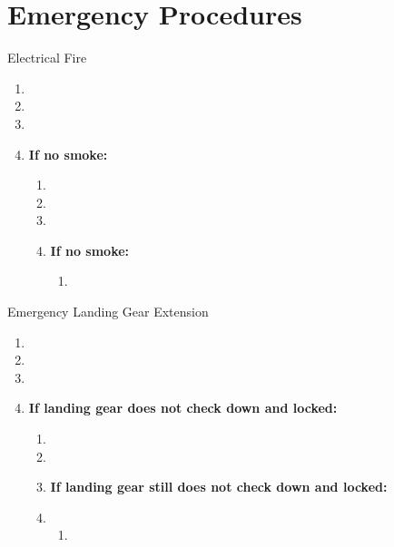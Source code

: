\section{Emergency Procedures}
\clearpage

\begin{checklist_emerg}{Electrical Fire}
    \begin{enumerate}
        \item {}
        \item {}
        \item {}
        \item{
            \textbf{If no smoke:}
            \begin{enumerate}
                \item {}
                \item {}
                \item {}
                \item{
                    \textbf{If no smoke:}
                    \begin{enumerate}
                        \item {}

                    \end{enumerate}
                }
            \end{enumerate}
        }
    \end{enumerate}
\end{checklist_emerg}

\begin{checklist_emerg}{Emergency Landing Gear Extension}
    \begin{enumerate}
        \item {}
        \item {}
        \item {}
        \item{
            \textbf{If landing gear does not check down and locked:}
            \begin{enumerate}
                \item {}
                \item {}
                \item \textbf{If landing gear still does not check down and locked:}
                \item{
                    \begin{enumerate}
                        \item {}
                    \end{enumerate}
                }
            \end{enumerate}
        }

    \end{enumerate}
\end{checklist_emerg}
